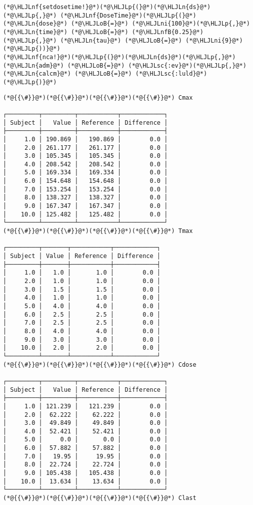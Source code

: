 \documentclass[12pt,a4paper]{article}
\newcommand{\HLJLn}[1]{#1}
\newcommand{\HLJLnf}[1]{\textcolor[RGB]{66,102,213}{#1}}
\newcommand{\HLJLsc}[1]{\textcolor[RGB]{201,61,57}{#1}}
\newcommand{\HLJLnfB}[1]{\textcolor[RGB]{59,151,46}{#1}}
\newcommand{\HLJLni}[1]{\textcolor[RGB]{59,151,46}{#1}}
\newcommand{\HLJLoB}[1]{\textcolor[RGB]{102,102,102}{\textbf{#1}}}
\newcommand{\HLJLp}[1]{#1}
\begin{document}
\begin{lstlisting}
(*@\HLJLnf{setdosetime!}@*)(*@\HLJLp{(}@*)(*@\HLJLn{ds}@*)(*@\HLJLp{,}@*) (*@\HLJLnf{DoseTime}@*)(*@\HLJLp{(}@*)(*@\HLJLn{dose}@*) (*@\HLJLoB{=}@*) (*@\HLJLni{100}@*)(*@\HLJLp{,}@*) (*@\HLJLn{time}@*) (*@\HLJLoB{=}@*) (*@\HLJLnfB{0.25}@*)(*@\HLJLp{,}@*) (*@\HLJLn{tau}@*) (*@\HLJLoB{=}@*) (*@\HLJLni{9}@*)(*@\HLJLp{))}@*)
(*@\HLJLnf{nca!}@*)(*@\HLJLp{(}@*)(*@\HLJLn{ds}@*)(*@\HLJLp{,}@*) (*@\HLJLn{adm}@*) (*@\HLJLoB{=}@*) (*@\HLJLsc{:ev}@*)(*@\HLJLp{,}@*) (*@\HLJLn{calcm}@*) (*@\HLJLoB{=}@*) (*@\HLJLsc{:luld}@*)(*@\HLJLp{)}@*)
\end{lstlisting}

\begin{lstlisting}
(*@{{\#}}@*)(*@{{\#}}@*)(*@{{\#}}@*)(*@{{\#}}@*) Cmax

┌─────────┬─────────┬───────────┬────────────┐
│ Subject │   Value │ Reference │ Difference │
├─────────┼─────────┼───────────┼────────────┤
│     1.0 │ 190.869 │   190.869 │        0.0 │
│     2.0 │ 261.177 │   261.177 │        0.0 │
│     3.0 │ 105.345 │   105.345 │        0.0 │
│     4.0 │ 208.542 │   208.542 │        0.0 │
│     5.0 │ 169.334 │   169.334 │        0.0 │
│     6.0 │ 154.648 │   154.648 │        0.0 │
│     7.0 │ 153.254 │   153.254 │        0.0 │
│     8.0 │ 138.327 │   138.327 │        0.0 │
│     9.0 │ 167.347 │   167.347 │        0.0 │
│    10.0 │ 125.482 │   125.482 │        0.0 │
└─────────┴─────────┴───────────┴────────────┘
(*@{{\#}}@*)(*@{{\#}}@*)(*@{{\#}}@*)(*@{{\#}}@*) Tmax

┌─────────┬───────┬───────────┬────────────┐
│ Subject │ Value │ Reference │ Difference │
├─────────┼───────┼───────────┼────────────┤
│     1.0 │   1.0 │       1.0 │        0.0 │
│     2.0 │   1.0 │       1.0 │        0.0 │
│     3.0 │   1.5 │       1.5 │        0.0 │
│     4.0 │   1.0 │       1.0 │        0.0 │
│     5.0 │   4.0 │       4.0 │        0.0 │
│     6.0 │   2.5 │       2.5 │        0.0 │
│     7.0 │   2.5 │       2.5 │        0.0 │
│     8.0 │   4.0 │       4.0 │        0.0 │
│     9.0 │   3.0 │       3.0 │        0.0 │
│    10.0 │   2.0 │       2.0 │        0.0 │
└─────────┴───────┴───────────┴────────────┘
(*@{{\#}}@*)(*@{{\#}}@*)(*@{{\#}}@*)(*@{{\#}}@*) Cdose

┌─────────┬─────────┬───────────┬────────────┐
│ Subject │   Value │ Reference │ Difference │
├─────────┼─────────┼───────────┼────────────┤
│     1.0 │ 121.239 │   121.239 │        0.0 │
│     2.0 │  62.222 │    62.222 │        0.0 │
│     3.0 │  49.849 │    49.849 │        0.0 │
│     4.0 │  52.421 │    52.421 │        0.0 │
│     5.0 │     0.0 │       0.0 │        0.0 │
│     6.0 │  57.882 │    57.882 │        0.0 │
│     7.0 │   19.95 │     19.95 │        0.0 │
│     8.0 │  22.724 │    22.724 │        0.0 │
│     9.0 │ 105.438 │   105.438 │        0.0 │
│    10.0 │  13.634 │    13.634 │        0.0 │
└─────────┴─────────┴───────────┴────────────┘
(*@{{\#}}@*)(*@{{\#}}@*)(*@{{\#}}@*)(*@{{\#}}@*) Clast


\end{lstlisting}
\end{document}
